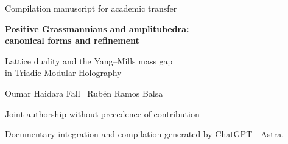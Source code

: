 \documentclass[a4paper,10pt]{article}
\theoremstyle{definition}\newtheorem{definition}[theorem]{Definition}
\theoremstyle{remark}\newtheorem{remark}[theorem]{Remark}
\numberwithin{equation}{section}
\begin{document}
\thispagestyle{plain}
\begin{center}
{\small Compilation manuscript for academic transfer}\par\vspace{6mm}
{\LARGE\bfseries Positive Grassmannians and amplituhedra:\\canonical forms and refinement}\par\vspace{3mm}
{\large Lattice duality and the Yang--Mills mass gap\\in Triadic Modular Holography}\par\vspace{5mm}
Oumar Haidara Fall \textperiodcentered\ Rubén Ramos Balsa\par
{\fontsize{8}{10}\selectfont Joint authorship without precedence of contribution\par
Documentary integration and compilation generated by ChatGPT - Astra.}
\end{center}
\end{document}
